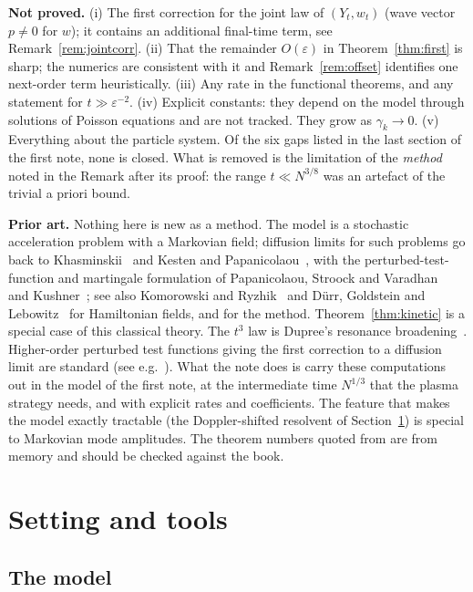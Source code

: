 \documentclass[11pt]{article}
\newcommand{\eps}{\varepsilon}
\theoremstyle{remark}
\begin{document}
\textbf{Not proved.}
(i) The first correction for the joint law of $(Y_t,w_t)$ (wave vector
$p\ne0$ for $w$); it contains an additional final-time term, see
Remark~\ref{rem:jointcorr}.
(ii) That the remainder $O(\eps)$ in Theorem~\ref{thm:first} is sharp; the
numerics are consistent with it and Remark~\ref{rem:offset} identifies one
next-order term heuristically.
(iii) Any rate in the functional theorems, and any statement for
$t\gg\eps^{-2}$.
(iv) Explicit constants: they depend on the model through solutions of
Poisson equations and are not tracked. They grow as $\gamma_k\to0$.
(v) Everything about the particle system. Of the six gaps listed in the last
section of the first note, none is closed. What is removed is the limitation
of the \emph{method} noted in the Remark after its proof: the range
$t\ll N^{3/8}$ was an artefact of the trivial a priori bound.

\textbf{Prior art.} Nothing here is new as a method. The model is a
stochastic acceleration problem with a Markovian field; diffusion limits for
such problems go back to Khasminskii~\cite{Khas} and Kesten and
Papanicolaou~\cite{KP}, with the perturbed-test-function and martingale
formulation of Papanicolaou, Stroock and Varadhan~\cite{PSV} and
Kushner~\cite{Kushner}; see also Komorowski and Ryzhik~\cite{KR} and
D\"urr, Goldstein and Lebowitz~\cite{DGL} for Hamiltonian fields, and
\cite{FGPS} for the method. Theorem~\ref{thm:kinetic} is a special case of
this classical theory. The $t^3$ law is Dupree's resonance
broadening~\cite{Dupree}. Higher-order perturbed test functions giving the
first correction to a diffusion limit are standard (see e.g.\
\cite{PavSt}). What the note does is carry these computations out in the
model of the first note, at the intermediate time $N^{1/3}$ that the plasma
strategy needs, and with explicit rates and coefficients. The feature that
makes the model exactly tractable (the Doppler-shifted resolvent of
Section~\ref{sec:setting}) is special to Markovian mode amplitudes.
The theorem numbers quoted from \cite{EK} are from memory and should be
checked against the book.

\section{Setting and tools}
\label{sec:setting}

\subsection{The model}
\end{document}
